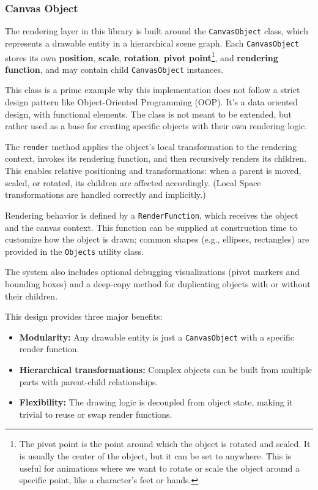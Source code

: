 \vspace{45pt}

\subsubsection{Canvas Object}
\label{subsubsec:canvas-object}

The rendering layer in this library is built around the {\footnotesize\texttt{CanvasObject}} class, which represents a drawable entity in a hierarchical scene graph. Each {\footnotesize\texttt{CanvasObject}} stores its own \textbf{position}, \textbf{scale}, \textbf{rotation}, \textbf{pivot point}\footnote{The pivot point is the point around which the object is rotated and scaled. It is usually the center of the object, but it can be set to anywhere. This is useful for animations where we want to rotate or scale the object around a specific point, like a character's feet or hands.}, and \textbf{rendering function}, and may contain child {\footnotesize\texttt{CanvasObject}} instances.

\begin{Note}
    This class is a prime example why this implementation does not follow a strict design pattern like Object-Oriented Programming (OOP). It's a data oriented design, with functional elements. The class is not meant to be extended, but rather used as a base for creating specific objects with their own rendering logic.
\end{Note}

The {\footnotesize\texttt{render}} method applies the object's local transformation to the rendering context, invokes its rendering function, and then recursively renders its children. This enables relative positioning and transformations: when a parent is moved, scaled, or rotated, its children are affected accordingly. (Local Space transformations are handled correctly and implicitly.)

Rendering behavior is defined by a {\footnotesize\texttt{RenderFunction}}, which receives the object and the canvas context. This function can be supplied at construction time to customize how the object is drawn; common shapes (e.g., ellipses, rectangles) are provided in the {\footnotesize\texttt{Objects}} utility class.

The system also includes optional debugging visualizations (pivot markers and bounding boxes) and a deep-copy method for duplicating objects with or without their children.

This design provides three major benefits:
\begin{itemize}
    \item \textbf{Modularity:} Any drawable entity is just a {\footnotesize\texttt{CanvasObject}} with a specific render function.
    \item \textbf{Hierarchical transformations:} Complex objects can be built from multiple parts with parent-child relationships.
    \item \textbf{Flexibility:} The drawing logic is decoupled from object state, making it trivial to reuse or swap render functions.
\end{itemize}